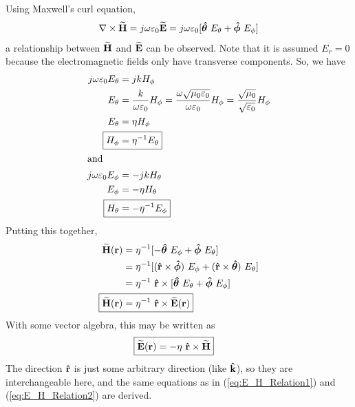 \begin{proofBox}
     Using Maxwell's curl equation, 
        $$\nabla \times \vecphasor{H} = j\omega\varepsilon_0\vecphasor{E} = j\omega\varepsilon_0[\uvec{\theta}\ E_\theta + \uvec{\phi}\ E_\phi]$$ 
        a relationship between $\boldsymbol{\mathrm{\widetilde{H}}}$ and $\boldsymbol{\mathrm{\widetilde{E}}}$ can be observed. Note that it is assumed $E_r = 0$ because the electromagnetic fields only have transverse components. So, we have 
        \begin{align*}
           j\omega\varepsilon_0 E_\theta &= jk H_\phi \\ 
            E_\theta &= \dfrac{k}{\omega \varepsilon_0} H_\phi = \dfrac{\omega\sqrt{\mu_0\varepsilon_0}}{\omega \varepsilon_0} H_\phi = \dfrac{\sqrt{\mu_0}}{\sqrt{\varepsilon_0}} H_\phi \\ 
            E_\theta  &= \eta H_\phi \\ 
            \Aboxed{H_\phi &= \eta^{-1} E_\theta} \\
            \intertext{and}
            j\omega\varepsilon_0 E_\phi &= -jk H_\theta \\
            E_\phi &= -\eta H_\theta  \\ 
            \Aboxed{H_\theta  &= -\eta^{-1} E_\phi}
        \end{align*}
        Putting this together,
        \begin{align*}
            \vecphasor{H}(\vec{r}) &= \eta^{-1} [-\uvec{\theta} \ E_\phi + \uvec{\phi} \ E_\theta] \\ 
            &= \eta^{-1} [(\uvec{r}\times\uvec{\phi}) \ E_\phi + (\uvec{r} \times\uvec{\theta}) \ E_\theta] \\ 
            &= \eta^{-1} \ \uvec{r} \times [\uvec{\theta}\ E_\theta + \uvec{\phi}\ E_\phi ] \\
            \Aboxed{\vecphasor{H}(\vec{r}) &= \eta^{-1} \ \uvec{r} \times \vecphasor{E}(\vec{r}) }
        \end{align*}
        With some vector algebra, this may be written as 
        \begin{align*}
            \Aboxed{
            \vecphasor{E}(\vec{r}) &= -\eta \ \uvec{r} \times \vecphasor{H}}
        \end{align*}
        The direction $\boldsymbol{{\mathrm{\hat{r}}}}$ is just some arbitrary direction (like $\boldsymbol{{\mathrm{\hat{k}}}}$), so they are interchangeable here, and the same equations as in (\ref{eq:E_H_Relation1}) and (\ref{eq:E_H_Relation2}) are derived. 
\end{proofBox}

